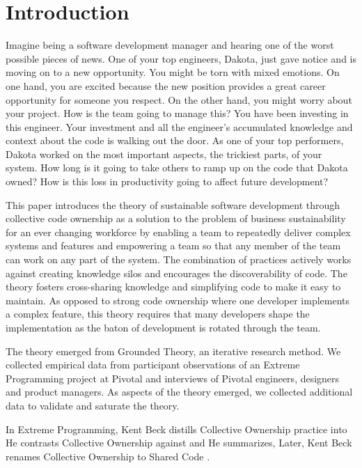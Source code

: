 
\section{Introduction}

Imagine being a software development manager and hearing one of the worst possible pieces of news.  One of your top engineers, Dakota, just gave notice and is moving on to a new opportunity. You might be torn with mixed emotions. On one hand, you are excited because the new position provides a great career opportunity for someone you respect. On the other hand, you might worry about your project. How is the team going to manage this? You have been investing in this engineer. Your investment and all the engineer's accumulated knowledge and context about the code is walking out the door.  As one of your top performers, Dakota worked on the most important aspects, the trickiest parts, of your system. How long is it going to take others to ramp up on the code that Dakota owned? How is this loss in productivity going to affect future development? 

This paper introduces the theory of sustainable software development through collective code ownership as a solution to the problem of business sustainability for an ever changing workforce by enabling a team to repeatedly deliver complex systems and features and empowering a team so that any member of the team can work on any part of the system. The combination of practices actively works against creating knowledge silos and encourages the discoverability of code. The theory fosters cross-sharing knowledge and simplifying code to make it easy to maintain. As opposed to strong code ownership where one developer implements a complex feature, this theory requires that many developers shape the implementation as the baton of development is rotated through the team.

The theory emerged from Grounded Theory, an iterative research method. We collected empirical data from participant observations of an Extreme Programming project at Pivotal and interviews of Pivotal engineers, designers and product managers. As aspects of the theory emerged, we collected additional data to validate and saturate the theory.

In Extreme Programming, Kent Beck distills Collective Ownership practice into  He contrasts Collective Ownership against  and  He summarizes,   \cite{ExtremeProgramming2000} Later, Kent Beck renames Collective Ownership to Shared Code \cite{ExtremeProgramming2004}. 


